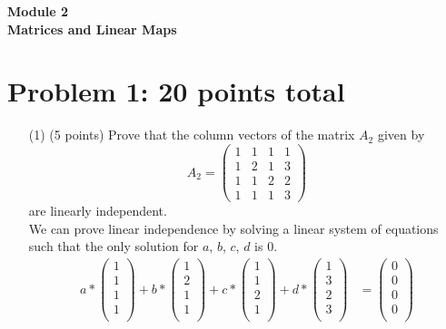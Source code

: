 \documentclass[12pt]{article}
\begin{document}
\begin{center}

{\Large\bf Module 2\\
\vspace{0.5cm}
Matrices and Linear Maps}\\[10pt]

\end{center}

\section*{Problem 1: 20 points total}
\label{prob-3.2}
\begin{itemize}
\item[(1)](5 points)
Prove that the column vectors of the matrix $A_2$ given by 
\[
A_2 = 
\begin{pmatrix}
1 & 1 & 1 & 1\\
1 & 2 & 1 & 3 \\
1 & 1 & 2 & 2 \\
1 & 1 & 1 & 3
\end{pmatrix}
\]
are linearly  independent. \\

We can prove linear independence by solving a linear system of equations such that the only solution for $a$, $b$, $c$, $d$ is 0. \\
\begin{align*}
    a * \begin{pmatrix}
    1 \\
    1 \\
    1 \\
    1 \\
    \end{pmatrix} + b * \begin{pmatrix}
    1 \\
    2 \\
    1 \\
    1 \\
    \end{pmatrix} + c * \begin{pmatrix}
    1 \\
    1 \\
    2 \\
    1 \\
    \end{pmatrix} + d * \begin{pmatrix}
    1 \\
    3 \\
    2 \\
    3 \\
    \end{pmatrix} &= \begin{pmatrix}
    0 \\
    0 \\
    0 \\
    0 \\
    \end{pmatrix}
\end{align*}


\end{itemize}
\end{document}
